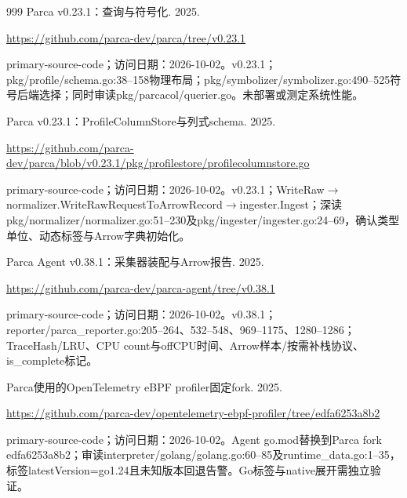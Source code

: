 \documentclass[UTF8,fontset=fandol,openany,11pt]{ctexbook}
\begin{document}
\begin{thebibliography}{999}
 Parca v0.23.1：查询与符号化. 2025.\par
\url{https://github.com/parca-dev/parca/tree/v0.23.1}\par
{\small primary-source-code；访问日期：2026-10-02。v0.\allowbreak{}23.\allowbreak{}1；pkg/\allowbreak{}profile/\allowbreak{}schema.\allowbreak{}go:\allowbreak{}38–158物理布局；pkg/\allowbreak{}symbolizer/\allowbreak{}symbolizer.\allowbreak{}go:\allowbreak{}490–525符号后端选择；同时审读pkg/\allowbreak{}parcacol/\allowbreak{}querier.\allowbreak{}go。未部署或测定系统性能。}

 Parca v0.23.1：ProfileColumnStore与列式schema. 2025.\par
\url{https://github.com/parca-dev/parca/blob/v0.23.1/pkg/profilestore/profilecolumnstore.go}\par
{\small primary-source-code；访问日期：2026-10-02。v0.\allowbreak{}23.\allowbreak{}1；WriteRaw\ensuremath{\rightarrow}\allowbreak{}\allowbreak{}normalizer.\allowbreak{}WriteRawRe\allowbreak{}questToArr\allowbreak{}owRecord\ensuremath{\rightarrow}\allowbreak{}\allowbreak{}ingester.\allowbreak{}Ingest；深读pkg/\allowbreak{}normalizer/\allowbreak{}normalizer.\allowbreak{}go:\allowbreak{}51–230及pkg/\allowbreak{}ingester/\allowbreak{}ingester.\allowbreak{}go:\allowbreak{}24–69，确认类型单位、动态标签与Arrow字典初始化。}

 Parca Agent v0.38.1：采集器装配与Arrow报告. 2025.\par
\url{https://github.com/parca-dev/parca-agent/tree/v0.38.1}\par
{\small primary-source-code；访问日期：2026-10-02。v0.\allowbreak{}38.\allowbreak{}1；reporter/\allowbreak{}parca\_\allowbreak{}reporter.\allowbreak{}go:\allowbreak{}205–264、532–548、969–1175、1280–1286；TraceHash/\allowbreak{}LRU、CPU count与offCPU时间、Arrow样本/\allowbreak{}按需补栈协议、is\_\allowbreak{}complete标记。}

 Parca使用的OpenTelemetry eBPF profiler固定fork. 2025.\par
\url{https://github.com/parca-dev/opentelemetry-ebpf-profiler/tree/edfa6253a8b2}\par
{\small primary-source-code；访问日期：2026-10-02。Agent go.\allowbreak{}mod替换到Parca fork edfa6253a8b2；审读interpreter/\allowbreak{}golang/\allowbreak{}golang.\allowbreak{}go:\allowbreak{}60–85及runtime\_\allowbreak{}data.\allowbreak{}go:\allowbreak{}1–35，标签latestVers\allowbreak{}ion=go1.\allowbreak{}24且未知版本回退告警。Go标签与native展开需独立验证。}


\end{thebibliography}
\end{document}
